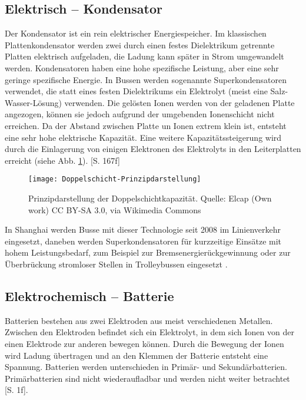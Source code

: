\subsection{Elektrisch – Kondensator} %
Der Kondensator ist ein rein elektrischer Energiespeicher. Im klassischen Plattenkondensator werden zwei durch einen festes Dielektrikum getrennte Platten elektrisch aufgeladen, die Ladung kann später in Strom umgewandelt werden. Kondensatoren haben eine hohe spezifische Leistung, aber eine sehr geringe spezifische Energie. In Bussen werden sogenannte Superkondensatoren verwendet, die statt eines festen Dielektrikums ein Elektrolyt (meist eine Salz-Wasser-Lösung) verwenden. Die gelösten Ionen werden von der geladenen Platte angezogen, können sie jedoch aufgrund der umgebenden Ionenschicht nicht erreichen. Da der Abstand zwischen Platte un Ionen extrem klein ist, entsteht eine sehr hohe elektrische Kapazität. Eine weitere Kapazitätssteigerung wird durch die Einlagerung von einigen Elektronen des Elektrolyts in den Leiterplatten erreicht (siehe Abb. \ref{abb_doppelschicht}). \cite{Sterner:2014}[S. 167f]\\
\begin{figure}\centering
	 \texttt{[image: Doppelschicht-Prinzipdarstellung]}
	 \caption{Prinzipdarstellung der Doppelschichtkapazität. Quelle: Elcap (Own work) CC BY-SA 3.0, via Wikimedia Commons}
	 \label{abb_doppelschicht}
\end{figure}
In Shanghai werden Busse mit dieser Technologie seit 2008 im Linienverkehr eingesetzt, daneben werden Superkondensatoren für kurzzeitige Einsätze mit hohem Leistungsbedarf, zum Beispiel zur Bremsenergierückgewinnung oder zur Überbrückung stromloser Stellen in Trolleybussen eingesetzt \cite{Barminer-Busgesellschaft:2012}.
\subsection{Elektrochemisch – Batterie}
Batterien bestehen aus zwei Elektroden aus meist verschiedenen Metallen. Zwischen den Elektroden befindet sich ein Elektrolyt, in dem sich Ionen von der einen Elektrode zur anderen bewegen können. Durch die Bewegung der Ionen wird Ladung übertragen und an den Klemmen der Batterie entsteht eine Spannung. Batterien werden unterschieden in Primär- und Sekundärbatterien. Primärbatterien sind nicht wiederaufladbar und werden nicht weiter betrachtet \cite{KiehneBattery}[S. 1f].
